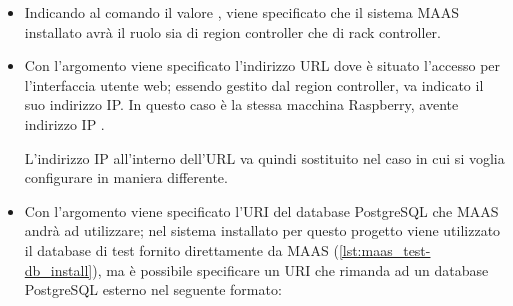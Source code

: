\begin{itemize}
    \item Indicando al comando  il valore , viene specificato che il sistema MAAS installato avrà il ruolo sia di region controller che di rack controller.

    \item Con l'argomento  viene specificato l'indirizzo URL dove è situato l'accesso per l'interfaccia utente web; essendo gestito dal region controller, va indicato il suo indirizzo IP.
    In questo caso è la stessa macchina Raspberry, avente indirizzo IP .
    
    L'indirizzo IP all'interno dell'URL va quindi sostituito nel caso in cui si voglia configurare in maniera differente.

    \item Con l'argomento  viene specificato l'URI del database PostgreSQL che MAAS andrà ad utilizzare;
    nel sistema installato per questo progetto viene utilizzato il database di test fornito direttamente da MAAS (\cref{lst:maas_test-db_install}), ma è possibile specificare un URI che rimanda ad un database PostgreSQL esterno nel seguente formato:\\\noindent
    {
      \\
      \code{[?name=value[\&...]]}
    }
        
\end{itemize}

